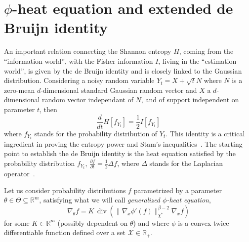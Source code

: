 \documentclass[entropy,article,submit,moreauthors,pdftex]{Definitions/mdpi}
\newcommand{\SZ}[1]{{\color{blue} #1}}
\def\Rset{\mathbb{R}}
\def\X{\mathcal{X}}
\def\div{\operatorname{div}}
\begin{document}

\section{$\phi$-heat equation and extended de Bruijn identity}
\label{sec:deBruijn}

An  important relation  connecting  the  Shannon entropy  $H$,  coming from  the
``information  world'',  with   the  Fisher  information  $I$,   living  in  the
``estimation world'', is  given by the de Bruijn identity  and is closely linked
to the  Gaussian distribution. Considering  a noisy random  variable $Y_t =  X +
\sqrt{t} N$  where $N$ is  a zero-mean $d$-dimensional standard  Gaussian random
vector  and $X$  a  $d$-dimensional random  vector independant  of  $N$, and  of
support independent on  parameter $t$, then $$\frac{d}{dt}  H[f_{Y_t}] = \frac12
I[f_{Y_t}]$$ where $f_{Y_t}$  stands for the probability  distribution of $Y_t$.
This identity is  a critical ingredient in proving the  entropy power and Stam's
inequalities~\cite{CovTho06}.   The starting  point to  establish the  de Bruijn
identity  is  the  heat  equation  satisfied  by  the  probability  distribution
$f_{Y_t}$, $\frac{\partial  f}{\partial t} =  \frac12 \Delta f$,  where $\Delta$
stands for the Laplacian operator~\cite{Wid75}.


Let  us  consider probability  distributions  $f$  parametrized by  a  parameter
$\theta  \in  \Theta \subseteq  \Rset^m$,  satisfying  what  we will  call  {\em
  generalized $\phi$-heat equation},
%
\begin{equation}
\label{eq:phi-heat_equation}
\nabla_\theta f = K \, \div\left( \| \nabla_x \phi'(f) \|_{\chi^*}^{\beta-2}
\nabla_x f \right)
\end{equation}
%
for some $K \in \Rset^m$ (possibly dependent  on $\theta$) and where $\phi$ is a
convex twice differentiable function defined over a set $\X \in \Rset_+$.
\end{document}
